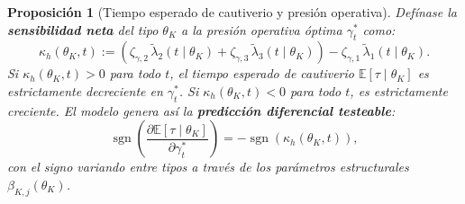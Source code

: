 \documentclass[12pt]{article}
\newtheorem{proposition}[theorem]{Proposición}
\theoremstyle{definition}
\theoremstyle{remark}
\newcommand{\1}{\mathbf{1}}
\begin{document}
\begin{proposition}[Tiempo esperado de cautiverio y presión operativa]
\label{prop:expected-captivity-gamma}
\label{prop:duracion-presion}
Defínase la \textbf{sensibilidad neta} del tipo $\theta_K$ a la presión operativa óptima $\gamma_t^\ast$ como:
\begin{equation}
\label{eq:kappa-c}
\kappa_h(\theta_K, t) := \left( \zeta_{\gamma,2}\, \tilde{\lambda}_2(t \mid \theta_K) + \zeta_{\gamma,3}\, \tilde{\lambda}_3(t \mid \theta_K) \right) - \zeta_{\gamma,1}\, \tilde{\lambda}_1(t \mid \theta_K).
\end{equation}
Si $\kappa_h(\theta_K, t) > 0$ para todo $t$, el tiempo esperado de cautiverio $\mathbb{E}[\tau \mid \theta_K]$ es estrictamente decreciente en $\gamma_t^\ast$. Si $\kappa_h(\theta_K, t) < 0$ para todo $t$, es estrictamente creciente. El modelo genera así la \textbf{predicción diferencial testeable}:
\begin{equation}
\operatorname{sgn} \left( \frac{\partial \mathbb{E}[\tau \mid \theta_K]}{\partial \gamma_t^\ast} \right) = - \operatorname{sgn}(\kappa_h(\theta_K, t)),
\end{equation}
con el signo variando entre tipos a través de los parámetros estructurales $\beta_{K,j}(\theta_K)$.
\end{proposition}
\end{document}
